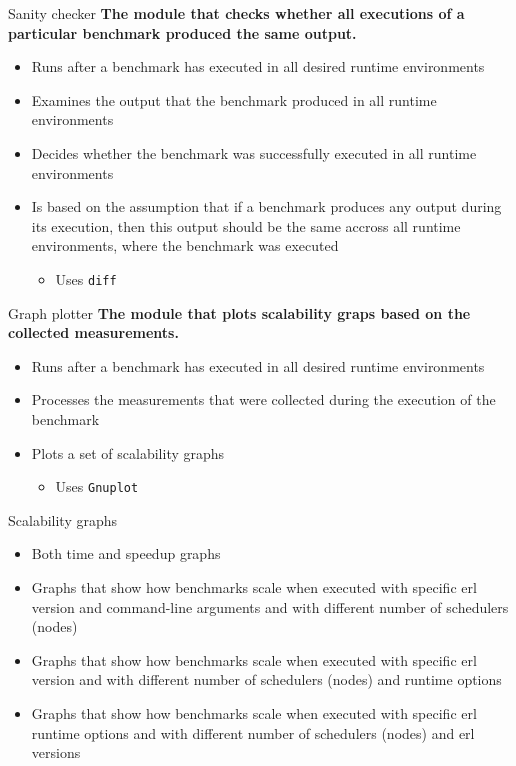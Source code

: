 \documentclass{beamer}
\begin{document}
\begin{frame}[t]{Sanity checker}
	{\bf The module that checks whether all executions of a particular benchmark produced the same output.}
    \begin{itemize}
		\item Runs \textcolor{burgundy}{after} a benchmark has executed in all desired runtime environments
		\item \textcolor{burgundy}{Examines} the output that the benchmark produced in all runtime environments
		\item Decides whether the benchmark was \textcolor{burgundy}{successfully executed} in all runtime environments
		\item Is based on the assumption that if a benchmark produces any output during its execution, then this output should be \textcolor{burgundy}{the same accross all runtime environments}, where the benchmark was executed
			\begin{itemize}
				\item Uses \texttt{diff}
			\end{itemize}
    \end{itemize}
\end{frame}

\begin{frame}[t]{Graph plotter}
	{\bf The module that plots scalability graps based on the collected measurements.}
    \begin{itemize}
		\item Runs \textcolor{burgundy}{after} a benchmark has executed in all desired runtime environments
		\item Processes the \textcolor{burgundy}{measurements} that were collected during the execution of the benchmark
		\item Plots a set of scalability graphs
			\begin{itemize}
				\item Uses \texttt{Gnuplot}
			\end{itemize}
    \end{itemize}
\end{frame}

\begin{frame}[t]{Scalability graphs}
	\begin{itemize}
		\item Both \textcolor{burgundy}{time} and \textcolor{burgundy}{speedup} graphs
		\item Graphs that show how benchmarks scale when executed with specific erl version and command-line arguments and with \textcolor{burgundy}{different number of schedulers (nodes)}
		\item Graphs that show how benchmarks scale when executed with specific erl version and with \textcolor{burgundy}{different number of schedulers (nodes) and runtime options}
		\item Graphs that show how benchmarks scale when executed with specific erl runtime options and with \textcolor{burgundy}{different number of schedulers (nodes) and erl versions}
	\end{itemize}
\end{frame}
\end{document}
